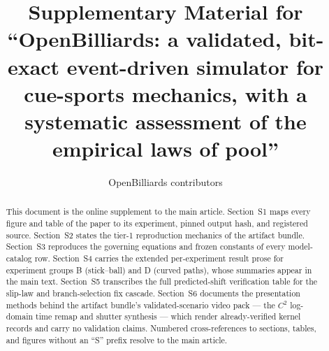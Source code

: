 \documentclass[review,12pt,authoryear]{elsarticle}
\begin{document}
\begin{frontmatter}

\title{Supplementary Material for ``OpenBilliards: a validated, bit-exact
event-driven simulator for cue-sports mechanics, with a systematic
assessment of the empirical laws of pool''}

\author{OpenBilliards contributors}

\begin{abstract}
This document is the online supplement to the main article. Section~S1
maps every figure and table of the paper to its experiment, pinned
output hash, and registered source. Section~S2 states the tier-1
reproduction mechanics of the artifact bundle. Section~S3 reproduces the
governing equations and frozen constants of every model-catalog row.
Section~S4 carries the extended per-experiment result prose for
experiment groups B (stick--ball) and D (curved paths), whose summaries
appear in the main text. Section~S5 transcribes the full predicted-shift
verification table for the slip-law and branch-selection fix cascade.
Section~S6 documents the presentation methods behind the artifact
bundle's validated-scenario video pack --- the $C^2$ log-domain time
remap and shutter synthesis --- which render already-verified kernel
records and carry no validation claims.
Numbered cross-references to sections, tables, and figures without an
``S'' prefix resolve to the main article.
\end{abstract}

\end{frontmatter}

\linenumbers










\end{document}
